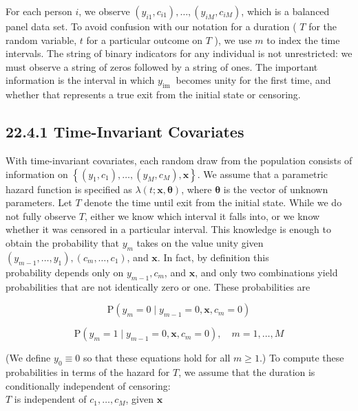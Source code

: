 \documentclass[10pt]{article}
\begin{document}
For each person $i$, we observe $\left(y_{i 1}, c_{i 1}\right), \ldots,\left(y_{i M}, c_{i M}\right)$, which is a balanced panel data set. To avoid confusion with our notation for a duration ( $T$ for the random variable, $t$ for a particular outcome on $T$ ), we use $m$ to index the time intervals. The string of binary indicators for any individual is not unrestricted: we must observe a string of zeros followed by a string of ones. The important information is the interval in which $y_{\text {im }}$ becomes unity for the first time, and whether that represents a true exit from the initial state or censoring.

\subsection*{22.4.1 Time-Invariant Covariates}
With time-invariant covariates, each random draw from the population consists of information on $\left\{\left(y_{1}, c_{1}\right), \ldots,\left(y_{M}, c_{M}\right), \mathbf{x}\right\}$. We assume that a parametric hazard function is specified as $\lambda(t ; \mathbf{x}, \boldsymbol{\theta})$, where $\boldsymbol{\theta}$ is the vector of unknown parameters. Let $T$ denote the time until exit from the initial state. While we do not fully observe $T$, either we know which interval it falls into, or we know whether it was censored in a particular interval. This knowledge is enough to obtain the probability that $y_{m}$ takes on the value unity given $\left(y_{m-1}, \ldots, y_{1}\right),\left(c_{m}, \ldots, c_{1}\right)$, and $\mathbf{x}$. In fact, by definition this\\
probability depends only on $y_{m-1}, c_{m}$, and $\mathbf{x}$, and only two combinations yield probabilities that are not identically zero or one. These probabilities are


\begin{equation*}
\mathrm{P}\left(y_{m}=0 \mid y_{m-1}=0, \mathbf{x}, c_{m}=0\right) \tag{22.38}
\end{equation*}



\begin{equation*}
\mathrm{P}\left(y_{m}=1 \mid y_{m-1}=0, \mathbf{x}, c_{m}=0\right), \quad m=1, \ldots, M \tag{22.39}
\end{equation*}


(We define $y_{0} \equiv 0$ so that these equations hold for all $m \geq 1$.) To compute these probabilities in terms of the hazard for $T$, we assume that the duration is conditionally independent of censoring:\\
$T$ is independent of $c_{1}, \ldots, c_{M}$, given $\mathbf{x}$
\end{document}
